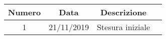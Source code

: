 \begin{tabular}{|c | c | c | c|} 
 	\hline
	 Numero & Data & Descrizione \\ [0.5ex] 
	\hline\hline
	1 & 21/11/2019 & Stesura iniziale \\ 
	\hline
\end{tabular}